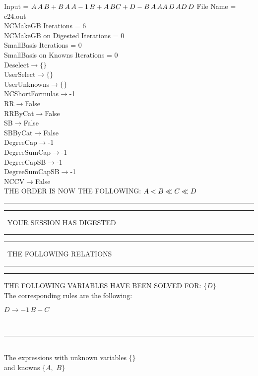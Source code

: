\documentclass[rep10,leqno]{report}
\begin{document}
\normalsize
\baselineskip=12pt
\noindent
Input = 
$
\\A\,
 A\,
 B + B\,
 A\,
 A\\
-1\,
 B + A\,
 B\\
C + D - B\,
 A\,
 A\\
A\,
 D\,
 A\\
D\,
 D\\
$
File Name = c24.out\\
NCMakeGB Iterations = 6\\
NCMakeGB on Digested Iterations = 0\\
SmallBasis Iterations = 0\\
SmallBasis on Knowns Iterations = 0\\
Deselect$\rightarrow \{\}$\\
UserSelect$\rightarrow \{\}$\\
UserUnknowns$\rightarrow \{\}$\\
NCShortFormulas$\rightarrow$-1\\
RR$\rightarrow $False\\
RRByCat$\rightarrow $False\\
SB$\rightarrow $False\\
SBByCat$\rightarrow $False\\
DegreeCap$\rightarrow $-1\\
DegreeSumCap$\rightarrow $-1\\
DegreeCapSB$\rightarrow $-1\\
DegreeSumCapSB$\rightarrow $-1\\
NCCV$\rightarrow $False\\
THE ORDER IS NOW THE FOLLOWING:\hfil\break
$
A<B\ll
C\ll
D\\
$
\rule[2pt]{6in}{4pt}\hfil\break
\rule[2pt]{1.879in}{4pt}
\ YOUR SESSION HAS DIGESTED\ 
\rule[2pt]{1.879in}{4pt}\hfil\break
\rule[2pt]{1.923in}{4pt}
\ THE FOLLOWING RELATIONS\ 
\rule[2pt]{1.923in}{4pt}\hfil\break
\rule[2pt]{6in}{4pt}\hfil\break
THE FOLLOWING VARIABLES HAVE BEEN SOLVED FOR:\hfil\break
$\{D\}$
\smallskip\\
The corresponding rules are the following:\smallskip\\
\begin{minipage}{6in}
$
D\rightarrow -1\,
 B - C
$
\end{minipage}\medskip\\
\rule[3pt]{6in}{.7pt}\\
The expressions with unknown variables $\{\}$\\
and knowns $\{A,
$ $
B\}$\smallskip\\
\end{document}
